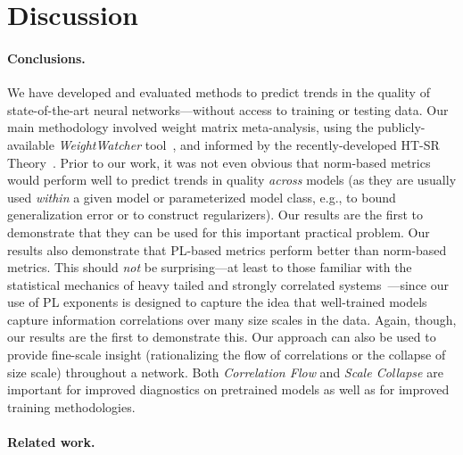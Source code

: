 \section{Discussion}


\paragraph{Conclusions.}


We have developed and evaluated methods to predict trends in the quality of state-of-the-art neural networks---without access to training or testing data.
Our main methodology involved weight matrix meta-analysis, using the publicly-available \emph{WeightWatcher} tool~\cite{weightwatcher_package}, and informed by the recently-developed HT-SR Theory~\cite{MM18_TR, MM19_HTSR_ICML, MM20_SDM}.
Prior to our work, it was not even obvious that norm-based metrics would perform well to predict trends in quality \emph{across} models (as they are usually used \emph{within} a given model or parameterized model class, e.g., to bound generalization error or to construct regularizers).
Our results are the first to demonstrate that they can be used for this important practical problem.
%
Our results also demonstrate that PL-based metrics perform better than norm-based metrics. 
This should \emph{not} be surprising---at least to those familiar with the statistical mechanics of heavy tailed and strongly correlated systems~\cite{BouchaudPotters03, SornetteBook, BP11, bun2017}---since our use of PL exponents is designed to capture the idea that well-trained models capture information correlations over many size scales in the data.
Again, though, our results are the first to demonstrate this.
%
Our approach can also be used to provide fine-scale insight (rationalizing the flow of correlations or the collapse of size scale) throughout a network. 
Both \emph{Correlation Flow} and \emph{Scale Collapse} are important for improved diagnostics on pretrained models as well as for improved training methodologies.


\paragraph{Related work.}


